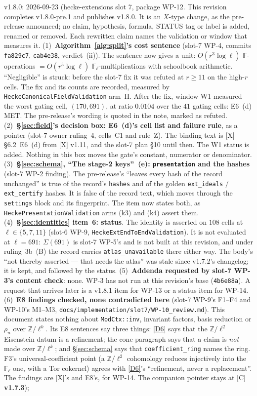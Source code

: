 \documentclass[11pt]{article}
\theoremstyle{remark}
\newcommand{\F}{\mathbb{F}}
\newcommand{\Z}{\mathbb{Z}}
\newcommand{\Fl}{\F_\ell}
\begin{document}
v1.8.0: 2026-09-23 (hecke-extensions slot 7, package WP-12. This revision completes
v1.8.0-pre.1 and publishes v1.8.0. It is an $X$-type change, as the pre-release announced; no
claim, hypothesis, formula, STATUS tag or label is added, renamed or removed. Each rewritten claim
names the validation or window that measures it.
(1)~\textbf{Algorithm~\ref{alg:split}'s cost sentence} (slot-7 WP-4, commits \texttt{fa829c7},
\texttt{cab4e38}, verdict~(ii)). The sentence now gives a unit: $O(r^3\log\ell)$ $\F$-operations
$=O(r^5\log\ell)$ $\Fl$-multiplications with schoolbook arithmetic. ``Negligible'' is struck:
before the slot-7 fix it was refuted at $r\ge11$ on the high-$r$ cells. The fix and its counts are
recorded, measured by \texttt{HeckeCanonicalFieldValidation} arm~H. After the fix, window W1
measured the worst gating cell, $(170,691)$, at ratio $0.0104$ over the $41$ gating cells:
E6~(d) MET. The pre-release's wording is quoted in the note, marked as refuted.
(2)~\textbf{\S\ref{sec:field}'s decision box: E6~(d)'s cell list and failure rule}, as a pointer
(slot-7 owner ruling~4, cells~C1 and rule~Z). The binding text is [X] \S6.2~E6~(d) from [X] v1.11,
and the slot-7 plan \S10 until then. The W1 status is added. Nothing in this box moves the gate's
constant, numerator or denominator.
(3)~\textbf{\S\ref{sec:schema}, ``The stage-2 keys''~(e): \texttt{presentation} and the hashes}
(slot-7 WP-2 finding). The pre-release's ``leaves every hash of the record unchanged'' is true of
the record's \texttt{hashes} and of the golden \texttt{ext\_ideals} / \texttt{ext\_certify} hashes.
It is false of the record text, which moves through the \texttt{settings} block and its
fingerprint. The item now states both, as \texttt{HeckePresentationValidation} arms (k3) and (k4)
assert them.
(4)~\textbf{\S\ref{sec:identities} item~6: status}. The identity is asserted on $108$ cells at
$\ell\in\{5,7,11\}$ (slot-6 WP-9, \texttt{HeckeExtEndToEndValidation}). It is not evaluated at
$\ell=691$: $\Sigma(691)$ is slot-7 WP-5's and is not built at this revision, and under ruling~3b~(B)
the record carries \texttt{atlas\_unavailable} there either way. The body's ``not thereby asserted
--- that needs the atlas'' was stale since v1.7.2's changelog; it is kept, and followed by the
status.
(5)~\textbf{Addenda requested by slot-7 WP-3's content check}: none. WP-3 has not run at this
revision's base (\texttt{4b6e88a}). A request that arrives later is a v1.8.1 item for WP-13 or a
status item for WP-14.
(6)~\textbf{E8 findings checked, none contradicted here} (slot-7 WP-9's F1--F4 and WP-10's M1--M3,
\texttt{docs/implementation/slot7/WP-10\_review.md}). This document states nothing about
\texttt{ModCtx::inv}, invariant factors, basis reduction or $\rho_n$ over $\Z/\ell^k$. Its E8
sentences say three things: \ref{D6} says that the $\Z/\ell^2$ Eisenstein datum is a refinement;
the cone paragraph says that a claim is \emph{not} made over $\Z/\ell^k$; and \S\ref{sec:schema}
says that \texttt{coefficient\_ring} names the ring. F3's universal-coefficient point (a
$\Z/\ell^2$ cohomology reduces injectively into the $\Fl$ one, with a Tor cokernel) agrees with
\ref{D6}'s ``refinement, never a replacement''. The findings are [X]'s and E8's, for WP-14.
The companion pointer stays at [C] \textbf{v1.7.3});
\end{document}
